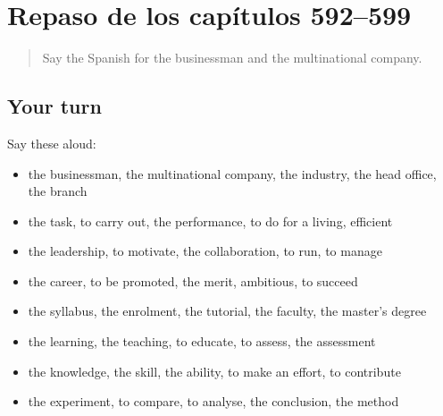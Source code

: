 \section[(dialogue)]{Repaso de los capítulos 592–599}

\label{lesson:ES-R599-repaso-592-599}



\begin{quote}
Say the Spanish for the businessman and the multinational company.
\end{quote}

\subsection*{Your turn}
Say these aloud:

\begin{itemize}
\raggedright
  \item the businessman, the multinational company, the industry, the head office, the branch
  \item the task, to carry out, the performance, to do for a living, efficient
  \item the leadership, to motivate, the collaboration, to run, to manage
  \item the career, to be promoted, the merit, ambitious, to succeed
  \item the syllabus, the enrolment, the tutorial, the faculty, the master's degree
  \item the learning, the teaching, to educate, to assess, the assessment
  \item the knowledge, the skill, the ability, to make an effort, to contribute
  \item the experiment, to compare, to analyse, the conclusion, the method
\end{itemize}

